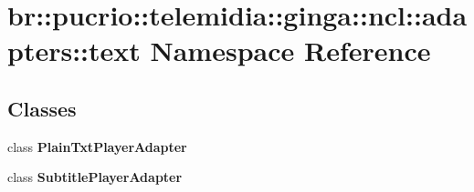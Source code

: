 \section{br::pucrio::telemidia::ginga::ncl::adapters::text Namespace Reference}
\label{namespacebr_1_1pucrio_1_1telemidia_1_1ginga_1_1ncl_1_1adapters_1_1text}


\subsection*{Classes}
\begin{CompactItemize}
\item 
class {\bf PlainTxtPlayerAdapter}
\item 
class {\bf SubtitlePlayerAdapter}
\end{CompactItemize}
